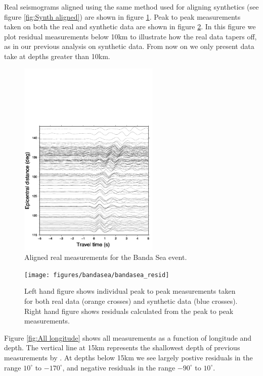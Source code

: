 \documentclass[11pt,a4paper]{article}
\begin{document}
Real seismograms aligned using the same method used for aligning synthetics (see figure \ref{fig:Synth aligned}) are shown in figure \ref{fig:Bandasea real aligned}. Peak to peak measurements taken on both the real and synthetic data are shown in figure \ref{fig:Bandasea residuals}. In this figure we plot residual measurements below 10km to illustrate how the real data tapers off, as in our previous analysis on synthetic data. From now on we only present data take at depths greater than 10km.

\begin{figure}
	\centering
	\includegraphics[width=0.6\textwidth]{figures/bandasea/bandasea_real_aligned}
	\caption{Aligned real measurements for the Banda Sea event.}
	\label{fig:Bandasea real aligned}
\end{figure}

\begin{figure}
	\centering
	\texttt{[image: figures/bandasea/bandasea\_resid]}
	\caption{Left hand figure shows individual peak to peak measurements taken for both real data (orange crosses) and synthetic data (blue crosses). Right hand figure shows residuals calculated from the peak to peak measurements.}
	\label{fig:Bandasea residuals}
\end{figure}

Figure \ref{fig:All longitude} shows all measurements as a function of longitude and depth. The vertical line at 15km represents the shallowest depth of previous measurements by \cite{Waszek2011a}. At depths below 15km we see largely postive residuals in the range $10^{\circ}$ to $-170^{\circ}$, and negative residuals in the range $-90^{\circ}$ to $10^{\circ}$.
\end{document}
